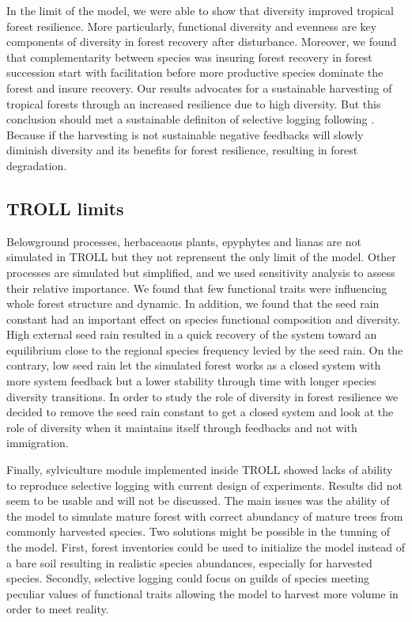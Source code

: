 \documentclass[12pt,]{article}
\theoremstyle{definition}
\theoremstyle{definition}
\theoremstyle{remark}
\begin{document}
In the limit of the model, we were able to show that diversity improved
tropical forest resilience. More particularly, functional diversity and
evenness are key components of diversity in forest recovery after
disturbance. Moreover, we found that complementarity between species was
insuring forest recovery in forest succession start with facilitation
before more productive species dominate the forest and insure recovery.
Our results advocates for a sustainable harvesting of tropical forests
through an increased resilience due to high diversity. But this
conclusion should met a sustainable definiton of selective logging
following \citet{Zimmerman2012}. Because if the harvesting is not
sustainable negative feedbacks will slowly diminish diversity and its
benefits for forest resilience, resulting in forest degradation.

\subsection{TROLL limits}\label{troll-limits}

Belowground processes, herbaceaous plants, epyphytes and lianas are not
simulated in TROLL but they not reprensent the only limit of the model.
Other processes are simulated but simplified, and we used sensitivity
analysis to assess their relative importance. We found that few
functional traits were influencing whole forest structure and dynamic.
In addition, we found that the seed rain constant had an important
effect on species functional composition and diversity. High external
seed rain resulted in a quick recovery of the system toward an
equilibrium close to the regional species frequency levied by the seed
rain. On the contrary, low seed rain let the simulated forest works as a
closed system with more system feedback but a lower stability through
time with longer species diversity transitions. In order to study the
role of diversity in forest resilience we decided to remove the seed
rain constant to get a closed system and look at the role of diversity
when it maintains itself through feedbacks and not with immigration.

Finally, sylviculture module implemented inside TROLL showed lacks of
ability to reproduce selective logging with current design of
experiments. Results did not seem to be usable and will not be
discussed. The main issues was the ability of the model to simulate
mature forest with correct abundancy of mature trees from commonly
harvested species. Two solutions might be possible in the tunning of the
model. First, forest inventories could be used to initialize the model
instead of a bare soil resulting in realistic species abundances,
especially for harvested species. Secondly, selective logging could
focus on guilds of species meeting peculiar values of functional traits
\citep[as wood density, see][]{Huth2004, Khler2004, Ruger2008} allowing
the model to harvest more volume in order to meet reality.
\end{document}
